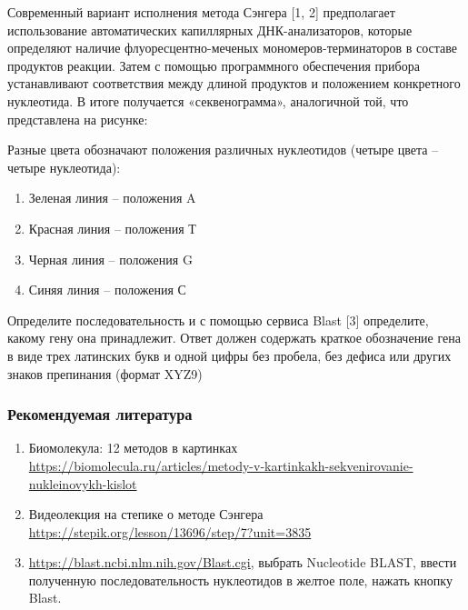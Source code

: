 
Современный вариант исполнения метода Сэнгера [1, 2] предполагает использование автоматических капиллярных ДНК-анализаторов, которые определяют наличие флуоресцентно-меченых мономеров-терминаторов в составе продуктов реакции. Затем с помощью программного обеспечения прибора устанавливают соответствия между длиной продуктов и положением конкретного нуклеотида. В итоге получается «секвенограмма», аналогичной той, что представлена на рисунке:

Разные цвета обозначают положения различных нуклеотидов (четыре цвета – четыре нуклеотида):

\begin{enumerate}
    \item Зеленая линия – положения A
    \item Красная линия – положения Т 
    \item Черная линия – положения G
    \item Синяя линия –  положения С
\end{enumerate}


Определите последовательность и с помощью сервиса Blast [3] определите, какому гену она принадлежит.
Ответ должен содержать краткое обозначение гена в виде трех латинских букв и одной цифры без пробела, без дефиса или других знаков препинания (формат XYZ9)

\subsubsection*{Рекомендуемая литература}

\begin{enumerate}
    \item Биомолекула: 12 методов в картинках \url{https://biomolecula.ru/articles/metody-v-kartinkakh-sekvenirovanie-nukleinovykh-kislot}
    \item Видеолекция на степике о методе Сэнгера \url{https://stepik.org/lesson/13696/step/7?unit=3835}
    \item \url{https://blast.ncbi.nlm.nih.gov/Blast.cgi}, выбрать Nucleotide BLAST, ввести полученную последовательность нуклеотидов в желтое поле, нажать кнопку Blast. 
\end{enumerate}